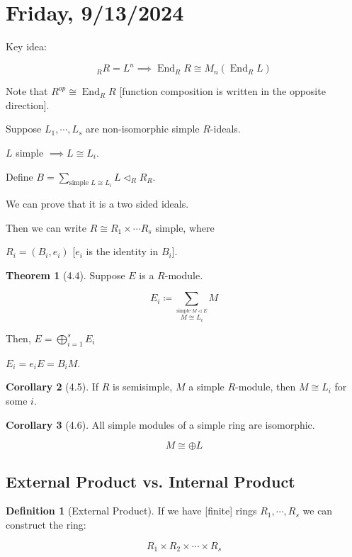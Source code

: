 \documentclass{article}
\theoremstyle{definition}
\newtheorem*{definition}{Definition}
\newtheorem{theorem}{Theorem}
\newtheorem{corollary}[theorem]{Corollary}
\newcommand{\End}{\operatorname{End}}
\begin{document}
\section*{Friday, 9/13/2024}

Key idea:

\[
    _R R = L^n \implies \End_R R \cong M_n(\End_R L)
\]

Note that \(R^{op} \cong \End_R R\) [function composition is written in the opposite direction].

Suppose \(L_1, \cdots , L_s\) are non-isomorphic simple \(R\)-ideals.

\(L\) simple \(\implies L \cong L_i\). 

Define \(B = \sum_{\text{simple } L \cong L_i} L \triangleleft _R R _R\).

We can prove that it is a two sided ideals. 

Then we can write \(R \cong R_1 \times \cdots R_s\) simple, where 

\(R_i = (B_i, e_i)\) [\(e_i\) is the identity in \(B_i\)]. 

\begin{theorem}
    [4.4] Suppose \(E\) is a \(R\)-module.

    \[
        E_i \coloneqq \sum_{\stackrel{\text{simple } M \triangleleft E}{M \cong L_i}} M 
    \]

    Then, \(E = \bigoplus_{i=1}^s E_i\)
    
    \(E_i = e_i E = B_i M\).
\end{theorem}

\begin{corollary}
    [4.5] If \(R\) is semisimple, \(M\) a simple \(R\)-module, then \(M \cong L_i\) for some \(i\).
\end{corollary}

\begin{corollary}
    [4.6] All simple modules of a simple ring are isomorphic.

    \[
        M \cong \oplus L
    \]
\end{corollary}

\subsection*{External Product vs. Internal Product}

\begin{definition}[External Product]
    If we have [finite] rings \(R_1, \cdots , R_s\) we can construct the ring:

    \[
        R_1 \times R_2 \times \cdots \times R_s
    \]
\end{definition}
\end{document}
